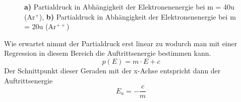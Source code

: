 \begin{figure}[h]
	\centering
	\caption{\textbf{a)} Partialdruck in Abhängigkeit der Elektronenenergie bei m = 40\;u (Ar$^+$), \textbf{b)} Partialdruck in Abhängigkeit der Elektronenenergie bei m = 20\;u (Ar$^{++}$)}
	\label{fig:plot_argon}
\end{figure}

Wie erwartet nimmt der Partialdruck erst linear zu wodurch man mit einer Regression in diesem Bereich die Auftrittsenergie bestimmen kann.
\begin{equation}
	p(E) = m\cdot E + c
\end{equation}
Der Schnittpunkt dieser Geraden mit der x-Achse entspricht dann der Auftrittsenergie
\begin{equation}
	E_a = -\frac{c}{m}
\end{equation}

